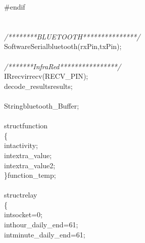 \documentclass[a4paper, 12pt]{article}
\newcommand\SPC{\hspace*{0.6em}}
\newcommand\HYP{\mbox{\char 45}}
\newcommand{\CppAComment}[1]{\textit{\textcolor[rgb]{0.2,0.4,1}{#1}}}
\newcommand{\CppAIdentifier}[1]{\textcolor[rgb]{0,1,0}{#1}}
\newcommand{\CppANumber}[1]{\textcolor[rgb]{0,0,1}{#1}}
\newcommand{\CppAPreprocessor}[1]{\textcolor[rgb]{0.2,0.8,0.8}{#1}}
\newcommand{\CppAReservedWord}[1]{\textcolor[rgb]{0,0.5,0}{#1}}
\newcommand{\CppASpace}[1]{\textcolor[rgb]{1,1,1}{\colorbox[rgb]{0,0,0}{#1}}}
\newcommand{\CppASymbol}[1]{\textcolor[rgb]{1,0,0}{#1}}
\begin{document}
\begin{ttfamily}
\CppAPreprocessor{\#endif}\\
\\
\\
\CppAComment{/********BLUETOOTH***************/}\\
\CppAIdentifier{SoftwareSerial}\CppASpace{\SPC }\CppAIdentifier{bluetooth}\CppASymbol{(}\CppAIdentifier{rxPin}\CppASymbol{,}\CppASpace{\SPC }\CppAIdentifier{txPin}\CppASymbol{)}\CppASymbol{;}\\
\\
\CppAComment{/*******Infra\HYP Red****************/}\\
\CppAIdentifier{IRrecv}\CppASpace{\SPC }\CppAIdentifier{irrecv}\CppASymbol{(}\CppAIdentifier{RECV\_PIN}\CppASymbol{)}\CppASymbol{;}\\
\CppAIdentifier{decode\_results}\CppASpace{\SPC }\CppAIdentifier{results}\CppASymbol{;}\\
\\
\CppAIdentifier{String}\CppASpace{\SPC }\CppAIdentifier{bluetooth\_Buffer}\CppASymbol{;}\\
\\
\CppAReservedWord{struct}\CppASpace{\SPC }\CppAIdentifier{function}\CppASpace{\SPC }\\
\CppASymbol{\{}\\
\CppASpace{\SPC \SPC }\CppAReservedWord{int}\CppASpace{\SPC }\CppAIdentifier{activity}\CppASymbol{;}\\
\CppASpace{\SPC \SPC }\CppAReservedWord{int}\CppASpace{\SPC }\CppAIdentifier{extra\_value}\CppASymbol{;}\\
\CppASpace{\SPC \SPC }\CppAReservedWord{int}\CppASpace{\SPC }\CppAIdentifier{extra\_value2}\CppASymbol{;}\\
\CppASymbol{\}}\CppASpace{\SPC }\CppAIdentifier{function\_temp}\CppASymbol{;}\\
\\
\CppAReservedWord{struct}\CppASpace{\SPC }\CppAIdentifier{relay}\\
\CppASymbol{\{}\\
\CppASpace{\SPC \SPC }\CppAReservedWord{int}\CppASpace{\SPC }\CppAIdentifier{socket}\CppASpace{\SPC }\CppASymbol{=}\CppASpace{\SPC }\CppANumber{0}\CppASymbol{;}\\
\CppASpace{\SPC \SPC }\CppAReservedWord{int}\CppASpace{\SPC }\CppAIdentifier{hour\_daily\_end}\CppASpace{\SPC }\CppASymbol{=}\CppASpace{\SPC }\CppANumber{61}\CppASymbol{;}\\
\CppASpace{\SPC \SPC }\CppAReservedWord{int}\CppASpace{\SPC }\CppAIdentifier{minute\_daily\_end}\CppASpace{\SPC }\CppASymbol{=}\CppASpace{\SPC }\CppANumber{61}\CppASymbol{;}\\

\end{ttfamily}
\end{document}

